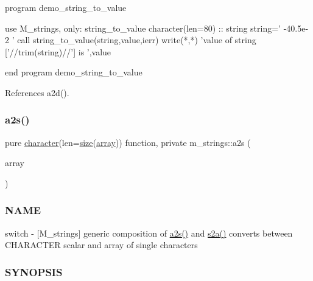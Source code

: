 \begin{DoxyVerb}program demo_string_to_value

 use M_strings, only: string_to_value
 character(len=80) :: string
    string=' -40.5e-2 '
    call string_to_value(string,value,ierr)
    write(*,*) 'value of string ['//trim(string)//'] is ',value

end program demo_string_to_value \end{DoxyVerb}
 

References a2d().

\mbox{\label{namespacem__strings_a9365ae5277199446d93fc5208be2e9a5}} 
\subsubsection{\texorpdfstring{a2s()}{a2s()}}
{\footnotesize\ttfamily pure \hyperlink{option__stopwatch_83_8txt_abd4b21fbbd175834027b5224bfe97e66}{character}(len=\hyperlink{what__overview_81_8txt_ab5692ed87074f1d5ec850a9ffa8b5af9}{size}(\hyperlink{intro__blas1_83_8txt_a89db1945e1a335ab0184c6a097821e32}{array})) function, private m\+\_\+strings\+::a2s (\begin{DoxyParamCaption}\item[{\hyperlink{option__stopwatch_83_8txt_abd4b21fbbd175834027b5224bfe97e66}{character}(len=1), dimension(\+:), intent(\hyperlink{M__journal_83_8txt_afce72651d1eed785a2132bee863b2f38}{in})}]{array }\end{DoxyParamCaption})\hspace{0.3cm}{\ttfamily [private]}}



\subsubsection*{N\+A\+ME}

switch -\/ \mbox{[}M\+\_\+strings\mbox{]} generic composition of \hyperlink{namespacem__strings_a9365ae5277199446d93fc5208be2e9a5}{a2s()} and \hyperlink{namespacem__strings_a5b05f337c8851871a4fb0b3cf56663cd}{s2a()} converts between C\+H\+A\+R\+A\+C\+T\+ER scalar and array of single characters

\subsubsection*{S\+Y\+N\+O\+P\+S\+IS}

